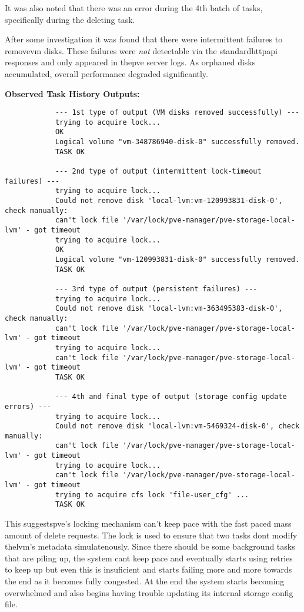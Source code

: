         It was also noted that there was an error during the 4th batch of tasks, specifically during the deleting task.

        After some investigation it was found that there were intermittent failures to remove\ac{vm} disks. These failures 
        were \emph{not} detectable via the standard\ac{http}\ac{api} responses and only appeared in the\ac{pve} server 
        logs. As orphaned disks accumulated, overall performance degraded significantly.

        \medskip
        \noindent\textbf{Observed Task History Outputs:}
        \begin{verbatim}
            --- 1st type of output (VM disks removed successfully) ---
            trying to acquire lock...
            OK
            Logical volume "vm-348786940-disk-0" successfully removed.
            TASK OK

            --- 2nd type of output (intermittent lock-timeout failures) ---
            trying to acquire lock...
            Could not remove disk 'local-lvm:vm-120993831-disk-0', check manually:
            can't lock file '/var/lock/pve-manager/pve-storage-local-lvm' - got timeout
            trying to acquire lock...
            OK
            Logical volume "vm-120993831-disk-0" successfully removed.
            TASK OK

            --- 3rd type of output (persistent failures) ---
            trying to acquire lock...
            Could not remove disk 'local-lvm:vm-363495383-disk-0', check manually:
            can't lock file '/var/lock/pve-manager/pve-storage-local-lvm' - got timeout
            trying to acquire lock...
            can't lock file '/var/lock/pve-manager/pve-storage-local-lvm' - got timeout
            TASK OK

            --- 4th and final type of output (storage config update errors) ---
            trying to acquire lock...
            Could not remove disk 'local-lvm:vm-5469324-disk-0', check manually:
            can't lock file '/var/lock/pve-manager/pve-storage-local-lvm' - got timeout
            trying to acquire lock...
            can't lock file '/var/lock/pve-manager/pve-storage-local-lvm' - got timeout
            trying to acquire cfs lock 'file-user_cfg' ...
            TASK OK
        \end{verbatim}

        This suggests\ac{pve}'s locking mechanism can't keep pace with the fast paced mass amount of delete requests. 
        The lock is used to ensure that two tasks dont modify the\ac{lvm}'s metadata simulatenously. Since there should be 
        some background tasks that are piling up, the system cant keep pace and eventually starts using retries to keep 
        up but even this is insuficient and starts failing more and more towards the end as it becomes fully congested. 
        At the end the system starts becoming overwhelmed and also begins having trouble updating its internal storage 
        config file.  

